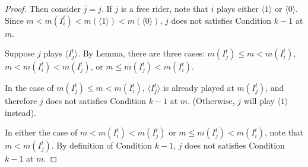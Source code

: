 \documentclass[12pt,letter]{article}
\theoremstyle{definition}
\theoremstyle{definition}
\theoremstyle{remark}
\theoremstyle{claim}
\begin{document}
\begin{proof}
Then consider $\bar{j}=j$. If $j$ is a free rider, note that $i$ plays either $\langle 1 \rangle$ or $\langle 0 \rangle$. Since $m< m(I^t_i)<m(\langle 1 \rangle)<m(\langle 0 \rangle)$, $j$ does not satisfies Condition $k-1$ at $m$.

Suppose $j$ plays $\langle I^t_j \rangle$. By Lemma, there are three cases: $m(I^t_j)\leq m< m(I^t_i)$, $m< m(I^t_i)< m(I^t_j)$, or $m\leq m(I^t_j)< m(I^t_i)$. 

In the case of $m(I^t_j)\leq m< m(I^t_i)$, $\langle I^t_j \rangle$ is already played at $m(I^t_j)$, and therefore $j$ does not satisfies Condition $k-1$ at $m$. (Otherwise, $j$ will play $\langle 1 \rangle$ instead). 

In either the case of $m< m(I^t_i)< m(I^t_j)$ or $m\leq m(I^t_j)< m(I^t_i)$, note that $m<m(I^t_j)$. By definition of Condition $k-1$, $j$ does not satisfies Condition $k-1$ at $m$. 

\end{proof}
\end{document}
